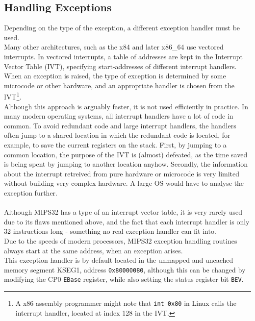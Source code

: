 \subsection{Handling Exceptions}
Depending on the type of the exception, a different exception handler must be
used.\\
Many other architectures, such as the x84 and later x86\_64 use vectored
interrupts. In vectored interrupts, a table of addresses are kept in the
Interrupt Vector Table (IVT), specifying start-addresses of different
interrupt handlers. When an exception is raised, the type of exception is
determined by some microcode or other hardware, and an appropriate handler is
chosen from the IVT\footnote{A x86 assembly
programmer might note that \texttt{int 0x80} in Linux calls the interrupt handler,
located at index 128 in the IVT.}\cite{osdev:interrupt_vector_table}\cite{see_mips_run}. \\
Although this approach is arguably faster, it is not used efficiently in
practice. In many modern operating systems, all interrupt handlers have a lot
of code in common. To avoid redundant code and large interrupt handlers, the
handlers often jump to a shared location in which the redundant code is located,
for example, to save the current registers on the stack.
First, by jumping to a common location, the purpose of the IVT is (almost) defeated,
as the time saved is being spent by jumping to another location anyhow. Secondly, the
information about the interrupt retreived from pure hardware or microcode is
very limited without building very complex hardware. A large OS would have to
analyse the exception further.\\\\
Although MIPS32 has a type of an interrupt vector table\cite{see_mips_run}, it is very rarely used due to its
flaws mentioned above, and the fact that each interrupt handler is only 32
instructions long - something no real exception handler can fit into\cite{see_mips_run}.\\
Due to the speeds of modern processors, MIPS32 exception handling routines always
start at the same address, when an exception arises. \\
This exception handler is by default located in the
unmapped and uncached memory segment KSEG1, address \texttt{0x80000080}, although
this can be changed by modifying the CP0 \texttt{EBase} register, while also
setting the status register bit \texttt{BEV}\cite{see_mips_run}.

